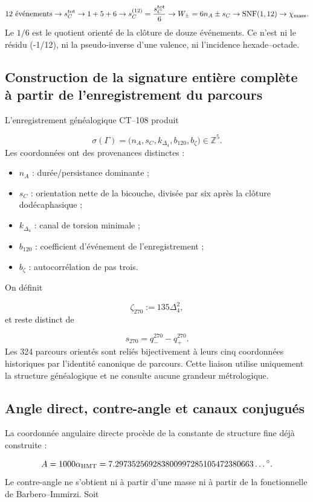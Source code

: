 \[
12\ \text{événements}
\to s_C^{\rm tot}
\to 1+5+6
\to s_C^{(12)}=\frac{s_C^{\rm tot}}6
\to W_\pm=6n_A\pm s_C
\to\operatorname{SNF}(1,12)
\to\chi_{\rm mass}.
\]
Le \(1/6\) est le quotient orienté de la clôture de douze événements. Ce n'est ni le résidu (-1/12), ni la pseudo-inverse d'une valence, ni l'incidence hexade--octade.

\subsection{Construction de la signature entière complète à partir de l'enregistrement du parcours}
L'enregistrement généalogique CT--108 produit

\[
 \sigma(\Gamma)
 =\bigl(n_A,s_C,k_{\Delta_4},b_{120},b_\zeta\bigr)\in\mathbb Z^5.
\]
Les coordonnées ont des provenances distinctes :

\begin{itemize}
\item \(n_A\) : durée/persistance dominante ;
\item \(s_C\) : orientation nette de la bicouche, divisée par six après la clôture
dodécaphasique ;

\item \(k_{\Delta_4}\) : canal de torsion minimale ;
\item \(b_{120}\) : coefficient d'événement de l'enregistrement ;
\item \(b_\zeta\) : autocorrélation de pas trois.
\end{itemize}
On définit

\[
 \zeta_{270}:=135\Delta_4^2,
\]
et reste distinct de

\[
 s_{270}=q_-^{270}-q_+^{270}.
\]
Les 324 parcours orientés sont reliés bijectivement à leurs cinq coordonnées historiques par l'identité canonique de parcours. Cette liaison utilise uniquement la structure généalogique et ne consulte aucune grandeur métrologique.

\subsection{Angle direct, contre-angle et canaux conjugués}
La coordonnée angulaire directe procède de la constante de structure fine déjà construite :

\[
 A=1000\alpha_{\rm HMT}
 =7.297352569283800997285105472380663\ldots{}^\circ.
\]
Le contre-angle ne s'obtient ni à partir d'une masse ni à partir de la fonctionnelle de Barbero--Immirzi. Soit

